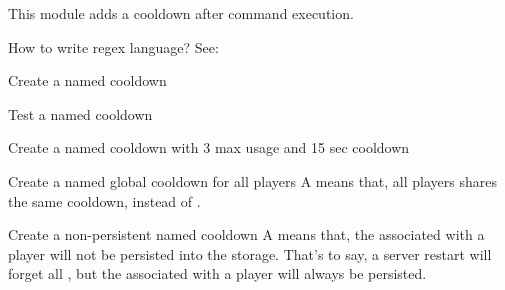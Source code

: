 \label{ch:command_cooldown}

This module adds a cooldown after command execution.

\begin{tips}{How to write regex language?}
    See:~
\end{tips}


\begin{example}{Create a named cooldown}
\end{example}

\begin{example}{Test a named cooldown}
\end{example}

\begin{example}{Create a named cooldown with 3 max usage and 15 sec cooldown}
\end{example}

\begin{example}{Create a named global cooldown for all players}
    A  means that, all players shares the same cooldown, instead of .
\end{example}

\begin{example}{Create a non-persistent named cooldown}
    A  means that, the  associated with a player will not be persisted into the storage.
    That's to say, a server restart will forget all , but the  associated with a player will always be persisted.
\end{example}
